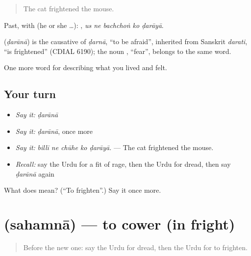 \begin{quote}
The cat frightened the mouse.
\end{quote}

Past, with  (he or she …):     , \emph{us ne bachchoṅ ko ḍarāyā}.

\begin{cousinweb}
\textbf{} (\emph{ḍarānā}) is the causative of \emph{ḍarnā}, \textquotedblleft{}to be afraid\textquotedblright{}, inherited from Sanskrit \emph{darati}, \textquotedblleft{}is frightened\textquotedblright{} (CDIAL 6190); the noun \textbf{}, \textquotedblleft{}fear\textquotedblright{}, belongs to the same word.
\end{cousinweb}

\begin{grammarlens}[title={What you've built}]
One more word for describing what you lived and felt.
\end{grammarlens}

\subsection*{Your turn}
\begin{itemize}
\raggedright
  \item \emph{Say it:} \emph{ḍarānā}
  \item \emph{Say it:} \emph{ḍarānā}, once more
  \item \emph{Say it:} \emph{billī ne chūhe ko ḍarāyā.} — The cat frightened the mouse.
  \item \emph{Recall:} say the Urdu for a fit of rage, then the Urdu for dread, then say \emph{ḍarānā} again
\end{itemize}

\begin{tcolorbox}[breakable,colback=teal!4,colframe=teal!35!black,title={Before you move on}]
What does  mean? (\textquotedblleft{}To frighten\textquotedblright{}.) Say it once more.
\end{tcolorbox}
\section[\texorpdfstring{\ur{سہمنا} (sahamnā)}{سہمنا (sahamnā)}]{ (sahamnā) — to cower (in fright)}

\label{lesson:UR-C445-sahamna}



\begin{quote}
Before the new one: say the Urdu for dread, then the Urdu for to frighten.
\end{quote}

